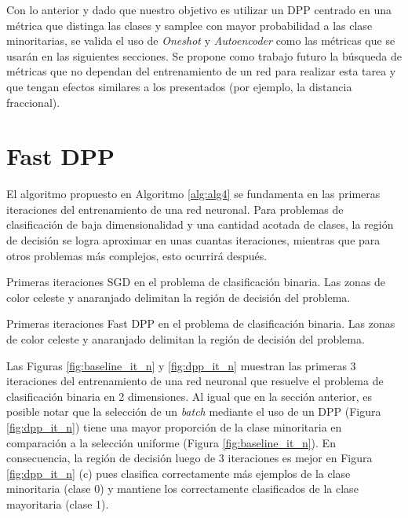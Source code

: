 \vspace{0.2cm}

Con lo anterior y dado que nuestro objetivo es utilizar un DPP centrado en una métrica que distinga las clases y samplee con mayor probabilidad a las clase minoritarias, se valida el uso de \textit{Oneshot} y \textit{Autoencoder} como las métricas que se usarán en las siguientes secciones. Se propone como trabajo futuro la búsqueda de métricas que no dependan del entrenamiento de un red para realizar esta tarea y que tengan efectos similares a los presentados (por ejemplo, la distancia fraccional).  

\section{Fast DPP}\label{section:fast_dpp_experiment}

El algoritmo propuesto en Algoritmo \ref{alg:alg4} se fundamenta en las primeras iteraciones del entrenamiento de una red neuronal. Para problemas de clasificación de baja dimensionalidad y una cantidad acotada de clases, la región de decisión se logra aproximar en unas cuantas iteraciones, mientras que para otros problemas más complejos, esto ocurrirá después. 

\begin{images}[\label{fig:baseline_it_n}]{\centering Primeras iteraciones SGD en el problema de clasificación binaria. Las zonas de color celeste y anaranjado delimitan la región de decisión del problema.}

\end{images}

\begin{images}[\label{fig:dpp_it_n}]{\centering Primeras iteraciones Fast DPP en el problema de clasificación binaria. Las zonas de color celeste y anaranjado delimitan la región de decisión del problema.}

\end{images}


Las Figuras \ref{fig:baseline_it_n} y \ref{fig:dpp_it_n} muestran las primeras 3 iteraciones del entrenamiento de una red neuronal que resuelve el problema de clasificación binaria en 2 dimensiones. Al igual que en la sección anterior, es posible notar que la selección de un \textit{batch} mediante el uso de un DPP (Figura \ref{fig:dpp_it_n}) tiene una mayor proporción de la clase minoritaria en comparación a la selección uniforme (Figura \ref{fig:baseline_it_n}). En consecuencia, la región de decisión luego de 3 iteraciones es mejor en Figura \ref{fig:dpp_it_n} (c) pues clasifica correctamente más ejemplos de la clase minoritaria (clase 0) y mantiene los correctamente clasificados de la clase mayoritaria (clase 1). 

